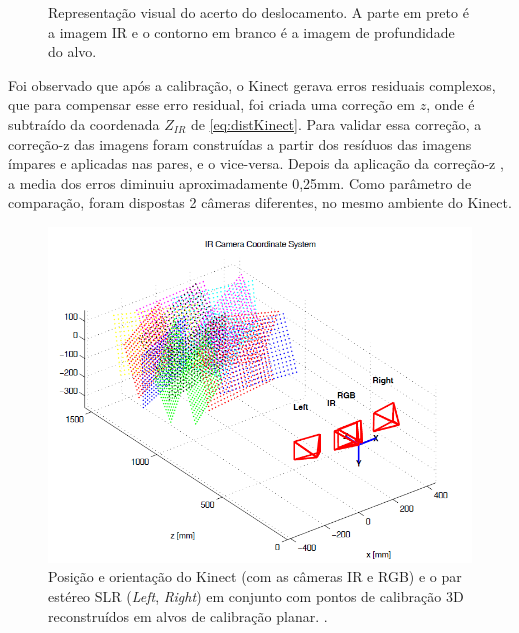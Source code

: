 \begin{figure}[!h]
	\centering
	\caption{%
	Representação visual do acerto do deslocamento. A parte em preto é a imagem IR e o contorno em branco é a imagem de profundidade do alvo.
	\protect\cite{smisek20133d}
	}\label{fig:deslocKinect}
\end{figure}

Foi observado que após a calibração, o Kinect gerava erros residuais complexos, que para compensar esse erro residual, foi criada uma correção em $z$, onde é subtraído da coordenada $Z_{IR}$ de \ref{eq:distKinect}.
Para validar essa correção, a correção-z das imagens foram construídas a partir dos resíduos das imagens ímpares e aplicadas nas pares, e o vice-versa. Depois da aplicação da correção-z , a media dos erros diminuiu aproximadamente 0,25mm.
Como parâmetro de comparação, foram dispostas 2 câmeras diferentes, no mesmo ambiente do Kinect.

\begin{figure}[!h]
	\centering
	\includegraphics[width=0.5\linewidth]{figs/ambientekinect.png}
	\caption{%
	Posição e orientação do Kinect (com as câmeras IR e RGB) e o par estéreo SLR (\emph{Left}, \emph{Right}) em conjunto com pontos de calibração 3D reconstruídos em alvos de calibração planar.
	\protect\cite{smisek20133d}.
	}\label{fig:ambienteKinect}
\end{figure}

